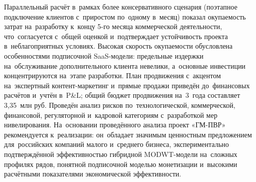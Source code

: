 Параллельный расчёт в~рамках более консервативного сценария (поэтапное
подключение клиентов с~приростом по~одному в~месяц) показал окупаемость затрат
на~разработку к~концу 5-го месяца коммерческой деятельности, что~согласуется
с~общей оценкой и~подтверждает устойчивость проекта в~неблагоприятных условиях.
Высокая скорость окупаемости обусловлена особенностями подписочной SaaS-модели:
предельные издержки на~обслуживание дополнительного клиента невелики,
а~основные инвестиции концентрируются на~этапе разработки. План продвижения
с~акцентом на~экспертный контент-маркетинг и~прямые продажи приведён
до~финансовых расчётов и~учтён в~P\&L; общий бюджет продвижения на~3~года
составляет 3,35~млн руб. Проведён анализ рисков по~технологической,
коммерческой, финансовой, регуляторной и~кадровой категориям с~разработкой
мер нивелирования.
На~основании проведённого анализа проект «ГМ-ПВР» рекомендуется к~реализации:
он~обладает значимым ценностным предложением для~российских компаний малого
и~среднего бизнеса, экспериментально подтверждённой эффективностью гибридной
MODWT-модели на~сложных профилях рядов, понятной подписочной моделью
монетизации и~высокими расчётными показателями экономической эффективности.
